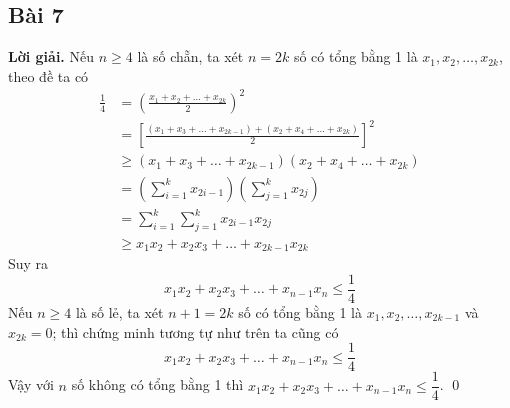 \documentclass[a4paper,14pt]{article}
\begin{document}
    \subsection{Bài 7}
        \textbf{Lời giải.}
            Nếu $n\geqslant 4$ là số chẵn, ta xét $n=2k$ số có tổng bằng 1 là $x_1,x_2,\ldots,x_{2k}$, theo đề ta có
                \begin{align*}
                    \frac{1}{4} &=\left(\frac{x_1+x_2+\ldots+x_{2k}}{2}\right)^2\\&=\left[\frac{(x_1+x_3+\ldots+x_{2k-1})+(x_2+x_4+\ldots+x_{2k})}{2}\right]^2
                    \\&\geqslant (x_1+x_3+\ldots+x_{2k-1})(x_2+x_4+\ldots+x_{2k}) \tag{Theo bất đẳng thức AM-GM}
                    \\&=\left(\sum_{i=1}^kx_{2i-1}\right)\left(\sum_{j=1}^kx_{2j}\right)
                    \\&=\sum_{i=1}^k\sum_{j=1}^kx_{2i-1}x_{2j}
                    \\&\geqslant x_1x_2+x_2x_3+\ldots+x_{2k-1}x_{2k}
                \end{align*}
            Suy ra $$x_1x_2+x_2x_3+\ldots+x_{n-1}x_n\leqslant \frac{1}{4}$$
            Nếu $n\geqslant 4$ là số lẻ, ta xét $n+1=2k$ số có tổng bằng 1 là $x_1,x_2,\ldots,x_{2k-1}$ và $x_{2k}=0$; thì chứng minh tương tự như trên ta cũng có
                $$x_1x_2+x_2x_3+\ldots+x_{n-1}x_n\leqslant \frac{1}{4}$$
            Vậy với $n$ số không có tổng bằng 1 thì $x_1x_2+x_2x_3+\ldots+x_{n-1}x_n\leqslant \dfrac{1}{4}$.
        \qed
\end{document}
